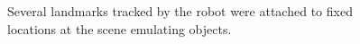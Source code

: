 \documentclass[letterpaper, 10 pt, conference]{ieeeconf}  %
\begin{document}
\begin{figure}[h!]
	\begin{center}
		
	\end{center}
	\caption{Several landmarks tracked by the robot were attached to fixed locations at the scene emulating objects.}
	\label{fig:exp_scene}
\end{figure}


	\begin{figure}[h!]
	\begin{center}
		

\end{center}
\end{figure}
\end{document}
